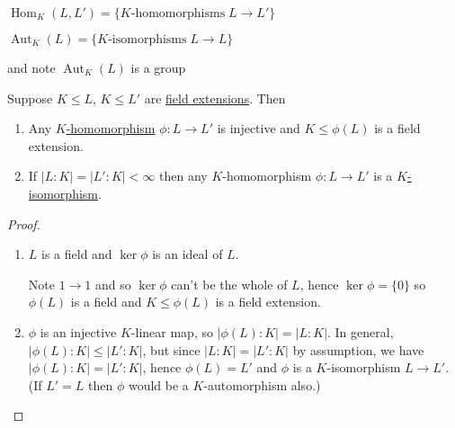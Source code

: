 \documentclass{article}
\DeclareMathOperator{\Aut}{Aut}
\DeclareMathOperator{\Hom}{Hom}
\begin{document}


\begin{notation}\hypertarget{not:hom}{}
    $ \Hom_K(L, L') = \{K\text{-homomorphisms} \; L \to L'\} $
\end{notation}

\begin{notation}
    \hypertarget{not:aut}{
    $ \Aut_K(L) = \{K\text{-isomorphisms} \; L \to L\} $
    } and note $\Aut_K(L)$ is a group
\end{notation}

\begin{nlemma}\label{lem:1.21}
    Suppose $K \leq L$, $K \leq L'$ are \hyperlink{def:fieldExt}{field extensions}. Then
    \begin{enumerate}[label=(\roman*)]
        \item Any \hyperlink{def:homo}{$K$-homomorphism} $\phi:L \to L'$ is injective and $K \leq \phi(L)$ is a field extension.
        \item If $|L:K| = |L':K| < \infty$ then any $K$-homomorphism $\phi:L \to L'$ is a \hyperlink{def:homo}{$K$-isomorphism}.
    \end{enumerate}
\end{nlemma}

\begin{proof}
    \leavevmode
    \begin{enumerate}[label=(\roman*)]
        \item $L$ is a field and $\ker \phi$ is an ideal of $L$.

            Note $1 \to 1$ and so $\ker \phi$ can't be the whole of $L$, hence $\ker \phi = \{0\}$ so $\phi(L)$ is a field and $K \leq \phi(L)$ is a field extension.
        \item $\phi$ is an injective $K$-linear map, so $|\phi(L):K| = |L:K|$. In general, $|\phi(L):K| \leq |L':K|$, but since $|L:K| = |L':K|$ by assumption, we have $|\phi(L):K| = |L':K|$, hence $\phi(L) = L'$ and $\phi$ is a $K$-isomorphism $L \to L'$.  (If $L' = L$ then $\phi$ would be a $K$-automorphism also.)
    \end{enumerate}
\end{proof}
\end{document}
